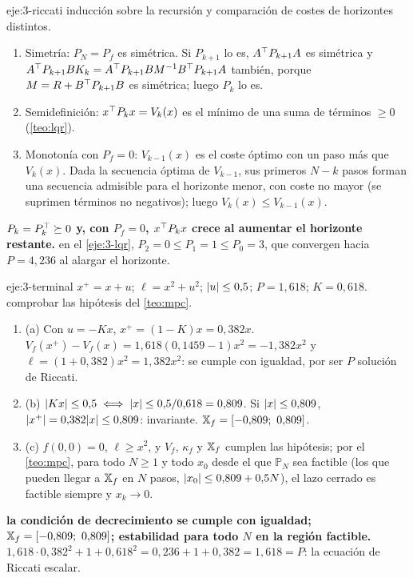 \begin{solucion}{eje:3-riccati}
\planteamiento inducción sobre la recursión y comparación de costes de horizontes distintos.
\pasos
\begin{enumerate}[label=\arabic*.]
  \item Simetría: $P_N=P_f$ es simétrica. Si $P_{k+1}$ lo es, $A^{\top} P_{k+1}A$ es simétrica y $A^{\top} P_{k+1}BK_k=A^{\top} P_{k+1}BM^{-1}B^{\top} P_{k+1}A$ también, porque $M=R+B^{\top} P_{k+1}B$ es simétrica; luego $P_k$ lo es.
  \item Semidefinición: $x^{\top} P_kx=V_k(x)$ es el mínimo de una suma de términos $\ge0$ (\cref{teo:lqr}).
  \item Monotonía con $P_f=0$: $V_{k-1}(x)$ es el coste óptimo con un paso más que $V_k(x)$. Dada la secuencia óptima de $V_{k-1}$, sus primeros $N-k$ pasos forman una secuencia admisible para el horizonte menor, con coste no mayor (se suprimen términos no negativos); luego $V_k(x)\le V_{k-1}(x)$.
\end{enumerate}
\resultado \textbf{$P_k=P_k^{\top}\succeq0$ y, con $P_f=0$, $x^{\top} P_kx$ crece al aumentar el horizonte restante.}
\comprobacion en el \cref{eje:3-lqr}, $P_2=0\le P_1=1\le P_0=3$, que convergen hacia $P=4{,}236$ al alargar el horizonte.
\end{solucion}

\begin{solucion}{eje:3-terminal}
\datos $x^{+}=x+u$; $\ell=x^{2}+u^{2}$; $\lvert u\rvert\le0{,}5$; $P=1{,}618$; $K=0{,}618$.
\planteamiento comprobar las hipótesis del \cref{teo:mpc}.
\pasos
\begin{enumerate}[label=\arabic*.]
  \item (a) Con $u=-Kx$, $x^{+}=(1-K)x=0{,}382x$. $V_f(x^{+})-V_f(x)=1{,}618(0{,}1459-1)x^{2}=-1{,}382x^{2}$ y $\ell=(1+0{,}382)x^{2}=1{,}382x^{2}$: se cumple con igualdad, por ser $P$ solución de Riccati.
  \item (b) $\lvert Kx\rvert\le0{,}5\iff\lvert x\rvert\le0{,}5/0{,}618=0{,}809$. Si $\lvert x\rvert\le0{,}809$, $\lvert x^{+}\rvert=0{,}382\lvert x\rvert\le0{,}809$: invariante. $\mathbb{X}_f=[-0{,}809;\ 0{,}809]$.
  \item (c) $f(0,0)=0$, $\ell\ge x^{2}$, y $V_f$, $\kappa_f$ y $\mathbb{X}_f$ cumplen las hipótesis; por el \cref{teo:mpc}, para todo $N\ge1$ y todo $x_0$ desde el que $\mathbb P_N$ sea factible (los que pueden llegar a $\mathbb{X}_f$ en $N$ pasos, $\lvert x_0\rvert\le0{,}809+0{,}5N$), el lazo cerrado es factible siempre y $x_k\to0$.
\end{enumerate}
\resultado \textbf{la condición de decrecimiento se cumple con igualdad; $\mathbb{X}_f=[-0{,}809;\ 0{,}809]$; estabilidad para todo $N$ en la región factible.}
\comprobacion $1{,}618\cdot0{,}382^{2}+1+0{,}618^{2}=0{,}236+1+0{,}382=1{,}618=P$: la ecuación de Riccati escalar.
\end{solucion}

